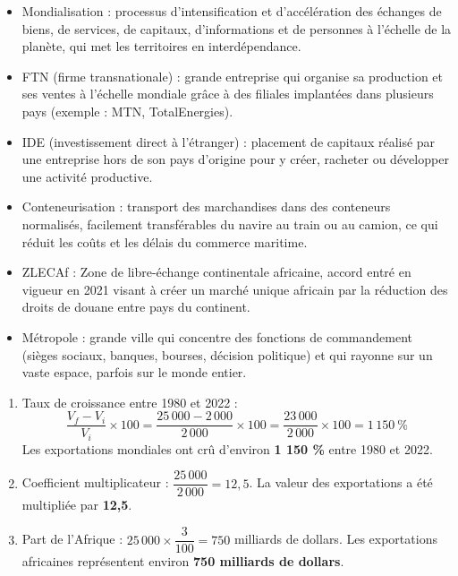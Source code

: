 \documentclass[11pt]{article}
\newcommand{\cle}[1]{{\popxbold\color{popdark}#1}}
\begin{document}
\begin{corrige}
\begin{itemize}
\item \cle{Mondialisation} : processus d'intensification et d'accélération des échanges de biens, de services, de capitaux, d'informations et de personnes à l'échelle de la planète, qui met les territoires en interdépendance.
\item \cle{FTN} (firme transnationale) : grande entreprise qui organise sa production et ses ventes à l'échelle mondiale grâce à des filiales implantées dans plusieurs pays (exemple : MTN, TotalEnergies).
\item \cle{IDE} (investissement direct à l'étranger) : placement de capitaux réalisé par une entreprise hors de son pays d'origine pour y créer, racheter ou développer une activité productive.
\item \cle{Conteneurisation} : transport des marchandises dans des conteneurs normalisés, facilement transférables du navire au train ou au camion, ce qui réduit les coûts et les délais du commerce maritime.
\item \cle{ZLECAf} : Zone de libre-échange continentale africaine, accord entré en vigueur en 2021 visant à créer un marché unique africain par la réduction des droits de douane entre pays du continent.
\item \cle{Métropole} : grande ville qui concentre des fonctions de commandement (sièges sociaux, banques, bourses, décision politique) et qui rayonne sur un vaste espace, parfois sur le monde entier.
\end{itemize}
\end{corrige}

\begin{corrige}
\begin{enumerate}
\item Taux de croissance entre 1980 et 2022 :
\[ \frac{V_f - V_i}{V_i} \times 100 = \frac{25\,000 - 2\,000}{2\,000} \times 100 = \frac{23\,000}{2\,000} \times 100 = 1\,150\ \% \]
Les exportations mondiales ont crû d'environ \textbf{1 150 \%} entre 1980 et 2022.
\item Coefficient multiplicateur : $\dfrac{25\,000}{2\,000} = 12,5$. La valeur des exportations a été multipliée par \textbf{12,5}.
\item Part de l'Afrique : $25\,000 \times \dfrac{3}{100} = 750$ milliards de dollars. Les exportations africaines représentent environ \textbf{750 milliards de dollars}.
\end{enumerate}
\end{corrige}
\end{document}
